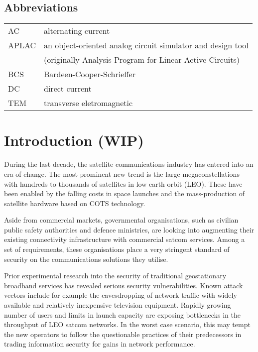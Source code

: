 \documentclass[english, 12pt, a4paper, elec, utf8, a-1b, online]{aaltothesis}
\begin{document}
\subsection*{Abbreviations}

\begin{tabular}{ll}
AC         & alternating current \\
APLAC      & an object-oriented analog circuit simulator and design tool \\
           & (originally Analysis Program for Linear Active Circuits) \\
BCS        & Bardeen-Cooper-Schrieffer \\ %
DC         & direct current \\
TEM        & transverse eletromagnetic
\end{tabular}


\cleardoublepage

\section{Introduction (WIP)}
During the last decade, the satellite communications industry has entered into an era of change. The most prominent new trend is the large megaconstellations with hundreds to thousands of satellites in low earth orbit (LEO). These have been enabled by the falling costs in space launches and the mass-production of satellite hardware based on COTS technology.

Aside from commercial markets, governmental organisations, such as civilian public safety authorities and defence ministries, are looking into augmenting their existing connectivity infrastructure with commercial satcom services. Among a set of requirements, these organisations place a very stringent standard of security on the communications solutions they utilise.

Prior experimental research into the security of traditional geostationary broadband services has revealed serious security vulnerabilities. Known attack vectors include for example the eavesdropping of network traffic with widely available and relatively inexpensive television equipment. Rapidly growing number of users and limits in launch capacity are exposing bottlenecks in the throughput of LEO satcom networks. In the worst case scenario, this may tempt the new operators to follow the questionable practices of their predecessors in trading information security for gains in network performance.
\end{document}

